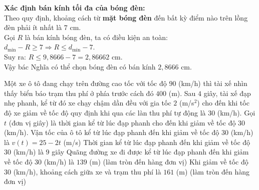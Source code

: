 \begin{ex}
{\begin{itemchoice}
			\textbf{Xác định bán kính tối đa của bóng đèn:}\\
			Theo quy định, khoảng cách từ \textbf{mặt bóng đèn} đến bất kỳ điểm nào trên lồng đèn phải ít nhất là $7$ cm.\\
			Gọi $R$ là bán kính bóng đèn, ta có điều kiện an toàn: $d_{\min} - R \ge 7 \Rightarrow R \le d_{\min} - 7$.\\
			Suy ra: $R \le 9{,}8666 - 7 = 2{,}86662$ cm.\\
			Vậy bác Nghĩa có thể chọn bóng đèn có bán kính $2{,}8666$ cm.
		\end{itemchoice}
	}
\end{ex}

\begin{ex}%
	Một xe ô tô đang chạy trên đường cao tốc với tốc độ $90$ (km/h) thì tài xế nhìn thấy biển báo trạm thu phí ở phía trước cách đó $400$ (m). Sau $4$ giây, tài xế đạp nhẹ phanh, kể từ đó xe chạy chậm dần đều với gia tốc $2$ (m/s$^2$) cho đến khi tốc độ xe giảm về tốc độ quy định khi qua các làn thu phí tự động là $30$ (km/h). Gọi $t$ (đơn vị giây) là thời gian kể từ lúc đạp phanh cho đến khi giảm về tốc độ $30$ (km/h).
	\choiceTF
	{\True Vận tốc của ô tô kể từ lúc đạp phanh đến khi giảm về tốc độ $30$ (km/h) là $v(t) = 25 - 2t$ (m/s)}
	{Thời gian kể từ lúc đạp phanh đến khi giảm về tốc độ $30$ (km/h) là $9$ giây}
	{\True Quãng đường xe đi được kể từ lúc đạp phanh đến khi giảm về tốc độ $30$ (km/h) là $139$ (m) (làm tròn đến hàng đơn vị)}
	{\True Khi giảm về tốc độ $30$ (km/h), khoảng cách giữa xe và trạm thu phí là $161$ (m) (làm tròn đến hàng đơn vị)}
\end{ex}

